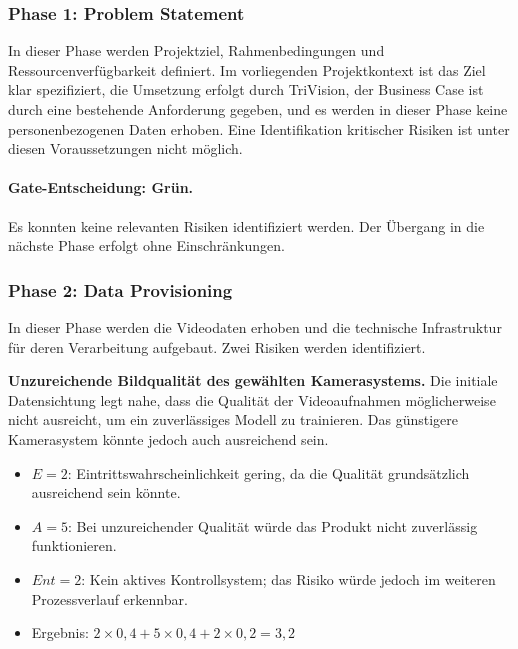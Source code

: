 \subsubsection{Phase 1: Problem Statement}

In dieser Phase werden Projektziel, Rahmenbedingungen und Ressourcenverfügbarkeit
definiert. Im vorliegenden Projektkontext ist das Ziel klar spezifiziert, die Umsetzung
erfolgt durch TriVision, der Business Case ist durch eine bestehende Anforderung
gegeben, und es werden in dieser Phase keine personenbezogenen Daten erhoben.
Eine Identifikation kritischer Risiken ist unter diesen Voraussetzungen nicht möglich.

\paragraph{Gate-Entscheidung: Grün.}
Es konnten keine relevanten Risiken identifiziert werden. Der Übergang in die
nächste Phase erfolgt ohne Einschränkungen.

\subsubsection{Phase 2: Data Provisioning}

In dieser Phase werden die Videodaten erhoben und die technische Infrastruktur
für deren Verarbeitung aufgebaut. Zwei Risiken werden identifiziert.

\textbf{Unzureichende Bildqualität des gewählten Kamerasystems.}
Die initiale Datensichtung legt nahe, dass die Qualität der Videoaufnahmen
möglicherweise nicht ausreicht, um ein zuverlässiges Modell zu trainieren.
Das günstigere Kamerasystem könnte jedoch auch ausreichend sein.
\begin{itemize}
    \item $E = 2$: Eintrittswahrscheinlichkeit gering, da die Qualität
    grundsätzlich ausreichend sein könnte.
    \item $A = 5$: Bei unzureichender Qualität würde das Produkt nicht
    zuverlässig funktionieren.
    \item $Ent = 2$: Kein aktives Kontrollsystem; das Risiko würde jedoch
    im weiteren Prozessverlauf erkennbar.
    \item Ergebnis: $2 \times 0{,}4 + 5 \times 0{,}4 + 2 \times 0{,}2 = 3{,}2$
\end{itemize}

